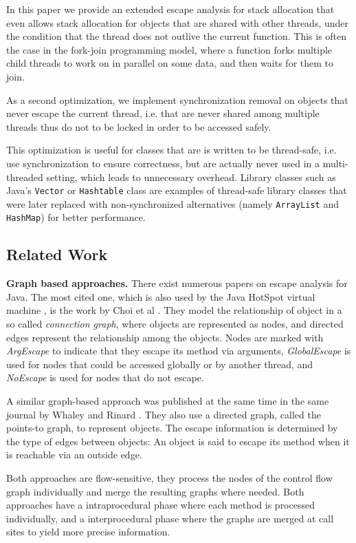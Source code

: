 \documentclass[letterpaper]{article}
\newcommand{\mypar}[1]{{\bf #1.}}
\begin{document}
In this paper we provide an extended escape analysis for stack allocation that
even allows stack allocation for objects that are shared with other threads,
under the condition that the thread does not outlive the current function.
This is often the case in the fork-join programming model, where a function
forks multiple child threads to work on in parallel on some data, and then
waits for them to join.

As a second optimization, we implement synchronization removal on objects that
never escape the current thread, i.e. that are never shared among multiple threads
thus do not to be locked in order to be accessed safely. 

This optimization is useful for classes that are is written to be thread-safe,
i.e. use synchronization to ensure correctness, but are actually never used
in a multi-threaded setting, which leads to unnecessary overhead. Library
classes such as Java's \texttt{Vector} or \texttt{Hashtable} class are examples
of thread-safe library classes that were later replaced with non-synchronized
alternatives (namely \texttt{ArrayList} and \texttt{HashMap}) for better
performance.

\subsection{Related Work}

\mypar{Graph based approaches}
There exist numerous papers on escape analysis for Java. The most cited one,
which is also used by the Java HotSpot virtual machine \cite{HotSpot}, is the work by
Choi et al \cite{Choi:99}. They model the relationship of object in a so called
\emph{connection graph}, where objects are represented as nodes, and directed
edges represent the relationship among the objects. Nodes are marked with \emph{ArgEscape}
to indicate that they escape its method via arguments, \emph{GlobalEscape} is used
for nodes that could be accessed globally or by another thread, and \emph{NoEscape}
is used for nodes that do not escape.

A similar graph-based approach was published at the same time in the same journal
by Whaley and Rinard \cite{Whaley:99}. They also use a directed graph, called the points-to graph,
to represent objects. The escape information is determined by the type of edges
between objects: An object is said to escape its method when it is reachable via an outside edge.

Both approaches are flow-sensitive, they process the nodes of the control flow graph
individually and merge the resulting graphs where needed. Both approaches have a
intraprocedural phase where each method is processed individually, and a interprocedural
phase where the graphs are merged at call sites to yield more precise information.
\end{document}
